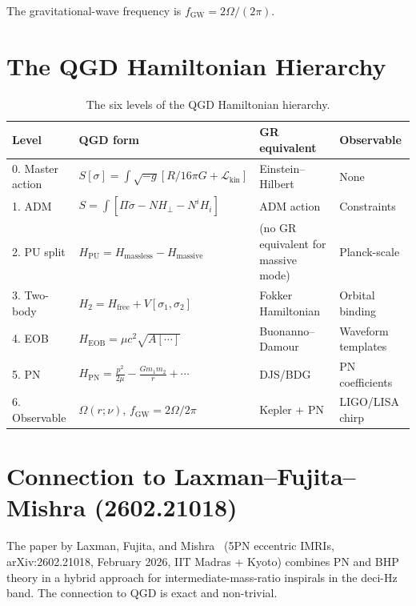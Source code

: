 \documentclass[11pt,a4paper]{article}
\theoremstyle{plain}
\theoremstyle{definition}
\theoremstyle{remark}
\newcommand{\Hperp}{H_\perp}
\newcommand{\Hi}{H_i}
\newcommand{\HEOB}{H_{\mathrm{EOB}}}
\newcommand{\HPU}{H_{\mathrm{PU}}}
\begin{document}
The gravitational-wave frequency is $f_{\mathrm{GW}} = 2\Omega/(2\pi)$.

\section{The QGD Hamiltonian Hierarchy}
\label{sec:hierarchy}

\begin{table}[h]
\centering
\renewcommand{\arraystretch}{1.45}
\caption{The six levels of the QGD Hamiltonian hierarchy.}
\label{tab:hierarchy}
\begin{tabular}{@{}p{2.2cm}p{4.5cm}p{4cm}p{2.8cm}@{}}
\toprule
Level & QGD form & GR equivalent & Observable \\
\midrule
\rowcolor{levelA}
0. Master action & $S[\sigma] = \int\sqrt{-g}[R/16\pi G + \mathcal{L}_{\mathrm{kin}}]$ &
  Einstein--Hilbert & None \\
1. ADM & $S = \int[\Pi\dot\sigma - N\Hperp - N^i\Hi]$ & ADM action &
  Constraints \\
\rowcolor{levelA}
2. PU split & $\HPU = H_{\mathrm{massless}} - H_{\mathrm{massive}}$ &
  (no GR equivalent for massive mode) & Planck-scale \\
3. Two-body & $H_{2} = H_{\mathrm{free}} + V[\sigma_1,\sigma_2]$ &
  Fokker Hamiltonian & Orbital binding \\
\rowcolor{levelA}
4. EOB & $\HEOB = \mu c^2\sqrt{A[\cdots]}$ & Buonanno--Damour & Waveform templates \\
5. PN & $H_{\mathrm{PN}} = \frac{p^2}{2\mu} - \frac{Gm_1m_2}{r} + \cdots$ &
  DJS/BDG & PN coefficients \\
\rowcolor{levelA}
6. Observable & $\Omega(r;\nu)$, $f_{\mathrm{GW}} = 2\Omega/2\pi$ & Kepler + PN &
  LIGO/LISA chirp \\
\bottomrule
\end{tabular}
\end{table}

\section{Connection to Laxman--Fujita--Mishra (2602.21018)}
\label{sec:LFM}

The paper by Laxman, Fujita, and Mishra~\cite{LFM2026}
(5PN eccentric IMRIs, arXiv:2602.21018, February 2026, IIT Madras + Kyoto)
combines PN and BHP theory in a hybrid approach for intermediate-mass-ratio
inspirals in the deci-Hz band.  The connection to QGD is exact and non-trivial.
\end{document}

